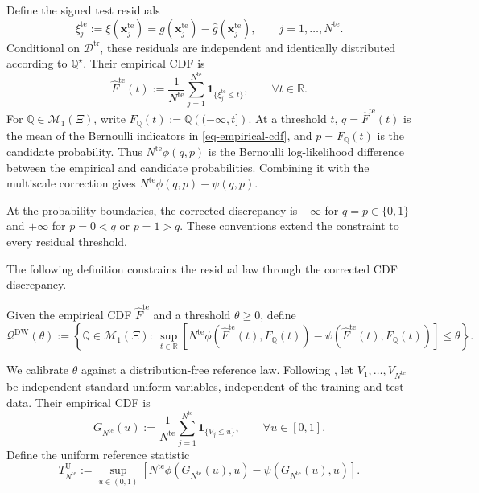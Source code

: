 \documentclass[review,11pt,3p,authoryear,nopreprintline]{elsarticle}
\begin{document}
Define the signed test residuals
\[
  \xi_j^{\mathrm{te}}:=\xi(\bm x_j^{\mathrm{te}})=g(\bm x_j^{\mathrm{te}})-\hat g(\bm x_j^{\mathrm{te}}),\qquad j=1,\ldots,N^{\mathrm{te}}.
\]
Conditional on $\mathcal D^{\mathrm{tr}}$, these residuals are independent and identically distributed according to $\mathbb Q^\star$. Their empirical CDF is
\begin{equation}
  \widehat F^{\mathrm{te}}(t):=\frac{1}{N^{\mathrm{te}}}\sum_{j=1}^{N^{\mathrm{te}}}\mathbf 1_{\{\xi_j^{\mathrm{te}}\le t\}},\qquad \forall t\in\mathbb R.
  \label{eq-empirical-cdf}
\end{equation}
For $\mathbb Q\in\mathcal M_1(\Xi)$, write $F_{\mathbb Q}(t):=\mathbb Q\left(({-\infty},t]\right)$. At a threshold $t$, $q=\widehat F^{\mathrm{te}}(t)$ is the mean of the Bernoulli indicators in \eqref{eq-empirical-cdf}, and $p=F_{\mathbb Q}(t)$ is the candidate probability. Thus $N^{\mathrm{te}}\phi(q,p)$ is the Bernoulli log-likelihood difference between the empirical and candidate probabilities. Combining it with the multiscale correction gives $N^{\mathrm{te}}\phi(q,p)-\psi(q,p)$.

At the probability boundaries, the corrected discrepancy is $-\infty$ for $q=p\in\{0,1\}$ and $+\infty$ for $p=0<q$ or $p=1>q$. These conventions extend the constraint to every residual threshold.

The following definition constrains the residual law through the corrected CDF discrepancy.

\begin{definition}
  \label{definition-dw-ambiguity-set}
  Given the empirical CDF $\widehat F^{\mathrm{te}}$ and a threshold $\theta\ge0$, define
  \begin{equation} 
    \label{eq-cdf-ambiguity-set}
      \mathcal Q^{\mathrm{DW}}(\theta):=\left\{\mathbb Q\in\mathcal M_1(\Xi):\ 
      \sup_{t\in\mathbb R}\left[ N^{\mathrm{te}}\phi\!\left(\widehat F^{\mathrm{te}}(t),F_{\mathbb Q}(t)\right) 
       {}-\psi\!\left(\widehat F^{\mathrm{te}}(t),F_{\mathbb Q}(t)\right)\right]\le\theta\right\}. 
  \end{equation} 
\end{definition}

We calibrate $\theta$ against a distribution-free reference law. Following \citet{L.J23}, let $V_1,\ldots,V_{N^{\mathrm{te}}}$ be independent standard uniform variables, independent of the training and test data. Their empirical CDF is
\begin{equation*}
  G_{N^{\mathrm{te}}}(u):=\frac{1}{N^{\mathrm{te}}}\sum_{j=1}^{N^{\mathrm{te}}}\mathbf 1_{\{V_j\le u\}},\qquad \forall u\in[0,1].
\end{equation*}
Define the uniform reference statistic
\begin{equation}
  T_{N^{\mathrm{te}}}^{\mathrm U}:=\sup_{u\in(0,1)}\left[N^{\mathrm{te}}\phi\!\left(G_{N^{\mathrm{te}}}(u),u\right)-\psi\!\left(G_{N^{\mathrm{te}}}(u),u\right)\right].
  \label{eq-dw-reference-statistic}
\end{equation}
\end{document}
